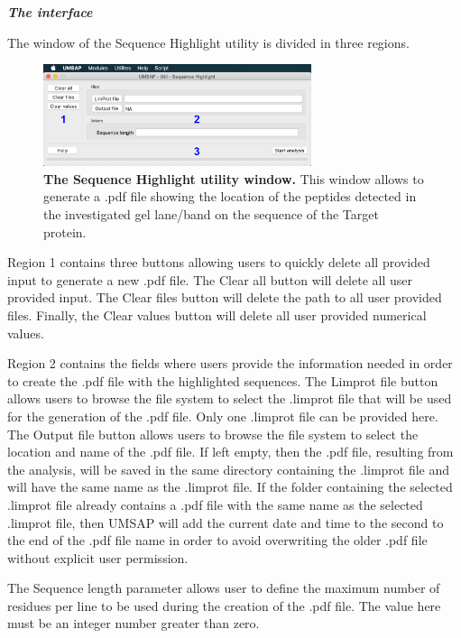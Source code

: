 \textit{\textbf{The interface}}

The window of the Sequence Highlight utility is divided in three regions. 

\begin{figure}[h]
	\centering
	\includegraphics[width=0.7\textwidth]{./IMAGES/UTIL-SEQUENCE-HIGHLIGHT/sequence-highlight.jpg}	    
	\caption[The Sequence Highlight utility window]{\textbf{The Sequence Highlight utility window.} This window allows to generate a .pdf file showing the location of the peptides detected in the investigated gel lane/band on the sequence of the Target protein.} 
	\label{fig:seqhighwindow}
	\vspace{-5pt} 	
\end{figure} 

Region \num{1} contains three buttons allowing users to quickly delete all provided input to generate a new .pdf file. The Clear all button will delete all user provided input. The Clear files button will delete the path to all user provided files. Finally, the Clear values button will delete all user provided numerical values.

Region \num{2} contains the fields where users provide the information needed in order to create the .pdf file with the highlighted sequences. The Limprot file button allows users to browse the file system to select the .limprot file that will be used for the generation of the .pdf file. Only one .limprot file can be provided here. The Output file button allows users to browse the file system to select the location and name of the .pdf file. If left empty, then the .pdf file, resulting from the analysis, will be saved in the same directory containing the .limprot file and will have the same name as the .limprot file. If the folder containing the selected .limprot file already contains a .pdf file with the same name as the selected .limprot file, then UMSAP will add the current date and time to the second to the end of the .pdf file name in order to avoid overwriting the older .pdf file without explicit user permission.

The Sequence length parameter allows user to define the maximum number of residues per line to be used during the creation of the .pdf file. The value here must be an integer number greater than zero.

